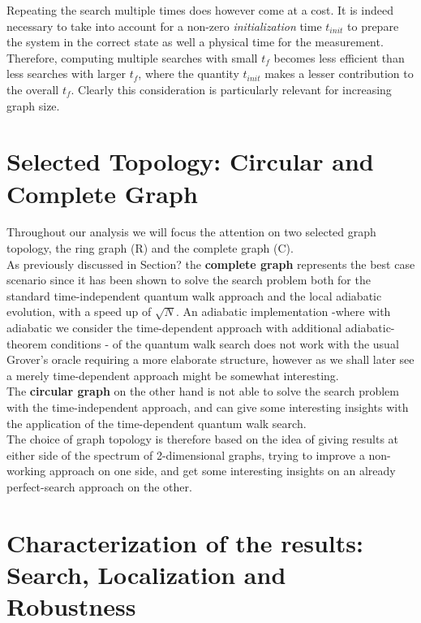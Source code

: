         Repeating the search multiple times does however come at a cost. It is indeed necessary to take into account for a non-zero \textit{initialization} time $t_{init}$ to prepare the system in the correct state as well a physical time for the measurement. Therefore, computing multiple searches with small $t_f$ becomes less efficient than less searches with larger $t_f$, where the quantity $t_{init}$ makes a lesser contribution to the overall $t_f$. Clearly this consideration is particularly relevant for increasing graph size.

\section{Selected Topology: Circular and Complete Graph}
    Throughout our analysis we will focus the attention on two selected graph topology, the ring graph (R) and the complete graph (C). \\

    As previously discussed in Section? the \textbf{complete graph} represents the best case scenario since it has been shown to solve the search problem both for the standard time-independent quantum walk approach and the local adiabatic evolution, with a speed up of $\sqrt{N}$. An adiabatic implementation -where with adiabatic we consider the time-dependent approach with additional adiabatic-theorem conditions -  of the quantum walk search does not work with the usual Grover's oracle requiring a more elaborate structure, however as we shall later see a merely time-dependent approach might be somewhat interesting. \\

    The \textbf{circular graph} on the other hand is not able to solve the search problem with the time-independent approach, and can give some interesting insights with the application of the time-dependent quantum walk search.  \\

    The choice of graph topology is therefore based on the idea of giving results at either side of the spectrum of 2-dimensional graphs, trying to improve a non-working approach on one side, and get some interesting insights on an already perfect-search approach on the other.

\section{Characterization of the results: Search, Localization and Robustness}
